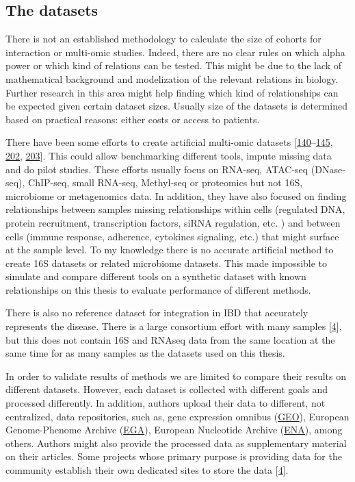 \documentclass[
  12pt,
  a4paper,
  twoside,
  openright]{book}
\begin{document}
\hypertarget{discussion-datasets}{%
\subsection{The datasets}\label{discussion-datasets}}

There is not an established methodology to calculate the size of cohorts for interaction or multi-omic studies.
Indeed, there are no clear rules on which alpha power or which kind of relations can be tested.
This might be due to the lack of mathematical background and modelization of the relevant relations in biology.
Further research in this area might help finding which kind of relationships can be expected given certain dataset sizes.
Usually size of the datasets is determined based on practical reasons: either costs or access to patients.

There have been some efforts to create artificial multi-omic datasets {[}\protect\hyperlink{ref-martuxednez-mira2018}{140}--\protect\hyperlink{ref-mccarthy2012}{145}, \protect\hyperlink{ref-chalise2016}{202}, \protect\hyperlink{ref-chung2019}{203}{]}.
This could allow benchmarking different tools, impute missing data and do pilot studies.
These efforts usually focus on RNA-seq, ATAC-seq (DNase-seq), ChIP-seq, small RNA-seq, Methyl-seq or proteomics but not 16S, microbiome or metagenomics data.
In addition, they have also focused on finding relationships between samples missing relationships within cells (regulated DNA, protein recruitment, transcription factors, siRNA regulation, etc. ) and between cells (immune response, adherence, cytokines signaling, etc.) that might surface at the sample level.
To my knowledge there is no accurate artificial method to create 16S datasets or related microbiome datasets.
This made impossible to simulate and compare different tools on a synthetic dataset with known relationships on this thesis to evaluate performance of different methods.

There is also no reference dataset for integration in IBD that accurately represents the disease.
There is a large consortium effort with many samples {[}\protect\hyperlink{ref-humanmicrobiomeprojectconsortium2012}{4}{]}, but this does not contain 16S and RNAseq data from the same location at the same time for as many samples as the datasets used on this thesis.

In order to validate results of methods we are limited to compare their results on different datasets.
However, each dataset is collected with different goals and processed differently.
In addition, authors upload their data to different, not centralized, data repositories, such as, gene expression omnibus (\href{https://www.ncbi.nlm.nih.gov/geo/}{GEO}), European Genome-Phenome Archive (\href{https://ega-archive.org/}{EGA}), European Nucleotide Archive (\href{https://www.ebi.ac.uk/ena/browser/home}{ENA}), among others.
Authors might also provide the processed data as supplementary material on their articles.
Some projects whose primary purpose is providing data for the community establish their own dedicated sites to store the data {[}\protect\hyperlink{ref-humanmicrobiomeprojectconsortium2012}{4}{]}.
\end{document}
